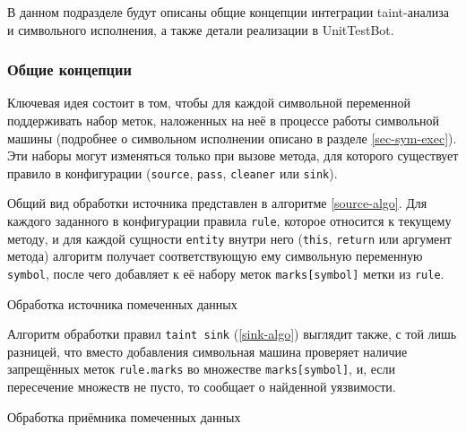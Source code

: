 В данном подразделе будут описаны общие концепции интеграции taint-анализа и символьного исполнения, а также детали реализации в UnitTestBot.

\subsubsection{Общие концепции}

Ключевая идея состоит в том, чтобы для каждой символьной переменной поддерживать набор меток, наложенных на неё в процессе работы символьной машины (подробнее о символьном исполнении описано в разделе \ref{sec-sym-exec}). Эти наборы могут изменяться только при вызове метода, для которого существует правило в конфигурации (\verb|source|, \verb|pass|, \verb|cleaner| или \verb|sink|). 

Общий вид обработки источника представлен в алгоритме \ref{source-algo}. Для каждого заданного в конфигурации правила \verb|rule|, которое относится к текущему методу, и для каждой сущности \verb|entity| внутри него (\verb|this|, \verb|return| или аргумент метода) алгоритм получает соответствующую ему символьную переменную \verb|symbol|, после чего добавляет к её набору меток \verb|marks[symbol]| метки из \verb|rule|.

\begin{algorithm}[hbt!]
\caption{Обработка источника помеченных данных}\label{source-algo}

\end{algorithm}

Алгоритм обработки правил \verb|taint sink| (\ref{sink-algo}) выглядит также, с той лишь разницей, что вместо добавления символьная машина проверяет наличие запрещённых меток \verb|rule.marks| во множестве \verb|marks[symbol]|, и, если пересечение множеств не пусто, то сообщает о найденной уязвимости.

\begin{algorithm}[hbt!]
\caption{Обработка приёмника помеченных данных}\label{sink-algo}

\end{algorithm}


